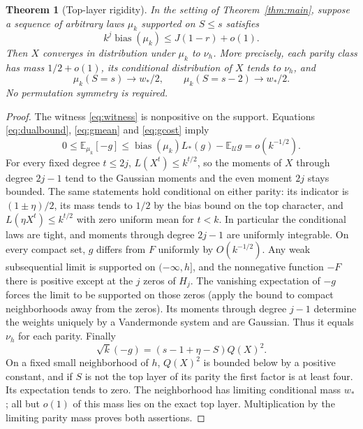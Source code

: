 \documentclass[11pt]{article}
\newtheorem{theorem}{Theorem}[section]
\theoremstyle{remark}\newtheorem{remark}[theorem]{Remark}
\newcommand{\E}{\mathbb E}
\newcommand{\U}{\mathcal U}
\newcommand{\bias}{\operatorname{bias}}
\begin{document}
\begin{theorem}[Top-layer rigidity]\label{thm:rigidity}
In the setting of Theorem~\ref{thm:main}, suppose a sequence of arbitrary laws $\mu_k$ supported on $S\le s$ satisfies
\[
 k^j\bias(\mu_k)\le J(1-r)+o(1).
\]
Then $X$ converges in distribution under $\mu_k$ to $\nu_h$. More precisely, each parity class has mass $1/2+o(1)$, its conditional distribution of $X$ tends to $\nu_h$, and
\[
 \mu_k(S=s)\longrightarrow w_*/2,\qquad
 \mu_k(S=s-2)\longrightarrow w_*/2.
\]
No permutation symmetry is required.
\end{theorem}
\begin{proof}
The witness \eqref{eq:witness} is nonpositive on the support. Equations \eqref{eq:dualbound}, \eqref{eq:gmean} and \eqref{eq:gcost} imply
\[
 0\le\E_{\mu_k}[-g]\le \bias(\mu_k)L_*(g)-\E_\U g=o(k^{-1/2}).
\]
For every fixed degree $t\le 2j$, $L(X^t)\le k^{t/2}$, so the moments of $X$ through degree $2j-1$ tend to the Gaussian moments and the even moment $2j$ stays bounded. The same statements hold conditional on either parity: its indicator is $(1\pm\eta)/2$, its mass tends to $1/2$ by the bias bound on the top character, and $L(\eta X^t)\le k^{t/2}$ with zero uniform mean for $t<k$. In particular the conditional laws are tight, and moments through degree $2j-1$ are uniformly integrable. On every compact set, $g$ differs from $F$ uniformly by $O(k^{-1/2})$. Any weak subsequential limit is supported on $(-\infty,h]$, and the nonnegative function $-F$ there is positive except at the $j$ zeros of $H_j$. The vanishing expectation of $-g$ forces the limit to be supported on those zeros (apply the bound to compact neighborhoods away from the zeros). Its moments through degree $j-1$ determine the weights uniquely by a Vandermonde system and are Gaussian. Thus it equals $\nu_h$ for each parity. Finally
\[
 \sqrt{k}(-g)=(s-1+\eta-S)Q(X)^2.
\]
On a fixed small neighborhood of $h$, $Q(X)^2$ is bounded below by a positive constant, and if $S$ is not the top layer of its parity the first factor is at least four. Its expectation tends to zero. The neighborhood has limiting conditional mass $w_*$; all but $o(1)$ of this mass lies on the exact top layer. Multiplication by the limiting parity mass proves both assertions.
\end{proof}
\end{document}
